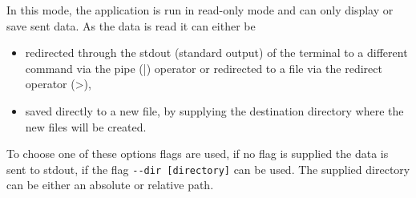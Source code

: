 In this mode, the application is run in read-only mode and can only display or save sent data. As the data is read it can either be
\begin{itemize}
  \item redirected through the stdout (standard output) of the terminal to a different command via the pipe (|) operator or redirected to a file via the redirect operator (>),
  \item saved directly to a new file, by supplying the destination directory where the new files will be created.
\end{itemize}
To choose one of these options flags are used, if no flag is supplied the data is sent to stdout, if the flag \texttt{-\--dir [directory]} can be used. The supplied directory can be either an absolute or relative path.
